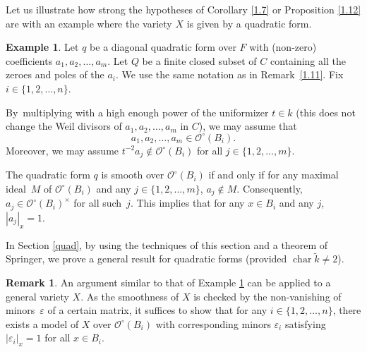 \documentclass[10pt]{amsart}
\DeclareMathOperator{\Char}{char}
\let\epsilon\varepsilon
\theoremstyle{definition}
\newtheorem{rem}[thm]{Remark}
\newtheorem{ex}[thm]{Example}
\begin{document}
Let us illustrate how strong the hypotheses of Corollary \ref{1.7} or Proposition \ref{1.12} are with an example where the variety $X$ is given by a quadratic form.

\begin{ex} \label{1.8.1}
Let $q$ be a diagonal quadratic form over $F$ with (non-zero) coefficients ${a_1, a_2, \dots, a_m}$. Let $Q$ be a finite closed subset of $C$ containing all the zeroes and poles of the $a_i$. We use the same notation as in Remark~\ref{1.11}. Fix $i \in \{1,2,\dots, n\}$.

By~multiplying with a high enough power of the uniformizer $t \in k$ (this does not change the Weil divisors of $a_1, a_2, \dots, a_m$ in $C$), we may assume that
\[
{a_1, a_2, \dots, a_m \in \mathcal{O}^{\circ}(B_i)}.
\]
Moreover, we may assume ${t^{-2}a_j \not \in \mathcal{O}^{\circ}(B_i)}$ for all $j \in \{1, 2, \dots, m\}$.

The quadratic form $q$ is smooth over $\mathcal{O}^{\circ}(B_i)$ if and only if for any maximal ideal~$M$ of $\mathcal{O}^{\circ}(B_i)$ and any $j \in \{1,2,\dots, m\}$, $a_j \not \in M$. Consequently, $a_j \in \mathcal{O}^{\circ}(B_i)^{\times}$ for all such~$j$. This implies that for any $x \in B_i$ and any $j$, $|a_j|_x=1$.
\end{ex}

In Section \ref{quad}, by using the techniques of this section and a theorem of Springer, we prove a general result for quadratic forms (provided $\Char \widetilde{k} \neq 2$).

\begin{rem} \label{1.8.2} An argument similar to that of Example \ref{1.8.1} can be applied to a general variety $X$.
As the smoothness of $X$ is checked by the non-vanishing of minors~$\epsilon$ of a certain matrix, it suffices to show that for any $i \in \{1, 2, \dots, n\}$, there exists a model of $X$ over $\mathcal{O}^{\circ}(B_i)$ with corresponding minors $\epsilon_i$ satisfying $|\epsilon_i|_x=1$ for all $x \in B_i$.
\end{rem}
\end{document}
